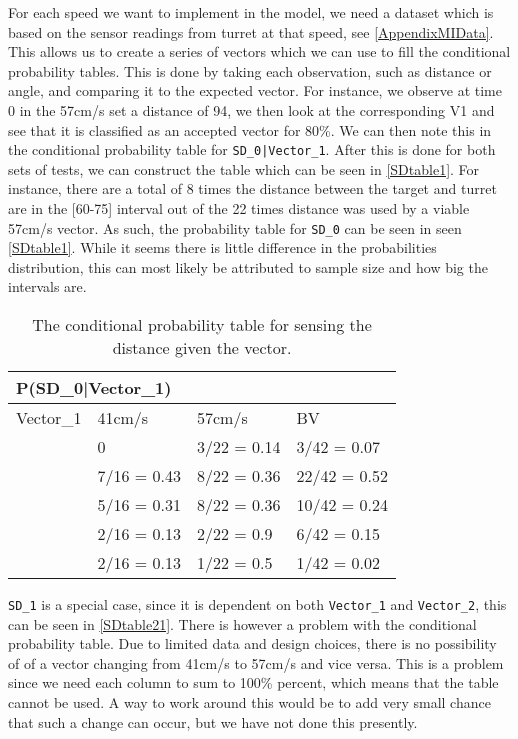 For each speed we want to implement in the model, we need a dataset which is
based on the sensor readings from turret at that speed, see
\autoref{AppendixMIData}. This allows us to create a series of vectors which we
can use to fill the conditional probability tables. This is done by taking each
observation, such as distance or angle, and comparing it to the expected vector.
For instance, we observe at time 0 in the 57cm/s set a distance of 94, we then
look at the corresponding V1 and see that it is classified as an accepted
vector for 80\%. We can then note this in the conditional probability table for
\texttt{SD\_0|Vector\_1}. After this is done for both sets of tests, we can
construct the table which can be seen in \autoref{SDtable1}. For instance, there
are a total of 8 times the distance between the target and turret are in the
[60-75] interval out of the 22 times distance was used by a viable 57cm/s
vector. As such, the probability table for \texttt{SD\_0}
can be seen in seen \autoref{SDtable1}. While it seems there is little
difference in the probabilities distribution, this can most likely be
attributed to sample size and how big the intervals are.

\begin{table}[H]
\centering
\begin{tabular}{|l|l|l|l|}
\hline
\multicolumn{4}{|l|}{P(SD\_0|Vector\_1)} \\ \hline
Vector\_1     & 41cm/s & 57cm/s & BV \\\hline 
[0 - 60]      & 0       & 3/22 = 0.14 & 3/42 = 0.07\\ \hline 
[60 - 75]    & 7/16 = 0.43 & 8/22 = 0.36 & 22/42 = 0.52\\ \hline
[75 - 90]   & 5/16 = 0.31 & 8/22 = 0.36 & 10/42 = 0.24\\ \hline
[90 - 105]   & 2/16 = 0.13 & 2/22 = 0.9 & 6/42 = 0.15\\ \hline
[105 - 255]   & 2/16 = 0.13& 1/22 = 0.5 & 1/42 = 0.02 \\ \hline
\end{tabular}
\caption{The conditional probability table for sensing the distance given the
vector.}
\label{SDtable1}
\end{table}
  
\texttt{SD\_1} is a special case, since it is dependent on both
\texttt{Vector\_1} and \texttt{Vector\_2}, this can be seen in
\autoref{SDtable21}. There is however a problem with the conditional probability
table. Due to limited data and design choices, there is no possibility of of a
vector changing from 41cm/s to 57cm/s and vice versa. This is a problem since we
need each column to sum to 100\% percent, which means that the table cannot be
used. A way to work around this would be to add very small chance that such
a change can occur, but we have not done this presently.

